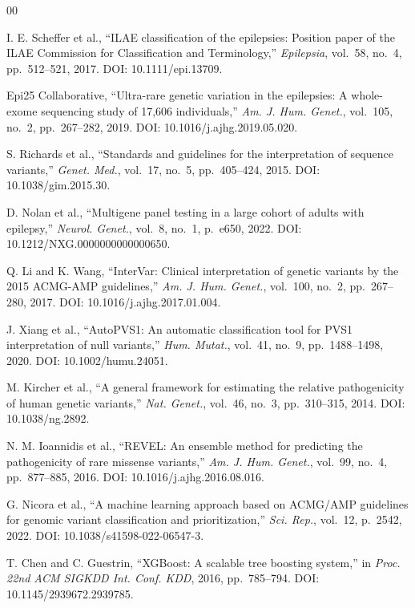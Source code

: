 \documentclass[conference]{IEEEtran}
\begin{document}
\begin{thebibliography}{00}

I. E. Scheffer et al., ``ILAE classification of the epilepsies: Position paper
of the ILAE Commission for Classification and Terminology,''
\textit{Epilepsia}, vol.~58, no.~4, pp.~512--521, 2017.
DOI: 10.1111/epi.13709.

Epi25 Collaborative, ``Ultra-rare genetic variation in the epilepsies: A
whole-exome sequencing study of 17,606 individuals,''
\textit{Am. J. Hum. Genet.}, vol.~105, no.~2, pp.~267--282, 2019.
DOI: 10.1016/j.ajhg.2019.05.020.

S. Richards et al., ``Standards and guidelines for the interpretation of
sequence variants,'' \textit{Genet. Med.}, vol.~17, no.~5, pp.~405--424,
2015. DOI: 10.1038/gim.2015.30.

D. Nolan et al., ``Multigene panel testing in a large cohort of adults with
epilepsy,'' \textit{Neurol. Genet.}, vol.~8, no.~1, p.~e650, 2022.
DOI: 10.1212/NXG.0000000000000650.

Q. Li and K. Wang, ``InterVar: Clinical interpretation of genetic variants by
the 2015 ACMG-AMP guidelines,'' \textit{Am. J. Hum. Genet.}, vol.~100,
no.~2, pp.~267--280, 2017. DOI: 10.1016/j.ajhg.2017.01.004.

J. Xiang et al., ``AutoPVS1: An automatic classification tool for PVS1
interpretation of null variants,'' \textit{Hum. Mutat.}, vol.~41, no.~9,
pp.~1488--1498, 2020. DOI: 10.1002/humu.24051.

M. Kircher et al., ``A general framework for estimating the relative
pathogenicity of human genetic variants,'' \textit{Nat. Genet.}, vol.~46,
no.~3, pp.~310--315, 2014. DOI: 10.1038/ng.2892.

N. M. Ioannidis et al., ``REVEL: An ensemble method for predicting the
pathogenicity of rare missense variants,'' \textit{Am. J. Hum. Genet.},
vol.~99, no.~4, pp.~877--885, 2016. DOI: 10.1016/j.ajhg.2016.08.016.

G. Nicora et al., ``A machine learning approach based on ACMG/AMP guidelines
for genomic variant classification and prioritization,''
\textit{Sci. Rep.}, vol.~12, p.~2542, 2022.
DOI: 10.1038/s41598-022-06547-3.

T. Chen and C. Guestrin, ``XGBoost: A scalable tree boosting system,'' in
\textit{Proc. 22nd ACM SIGKDD Int. Conf. KDD}, 2016, pp.~785--794.
DOI: 10.1145/2939672.2939785.


\end{thebibliography}
\end{document}
